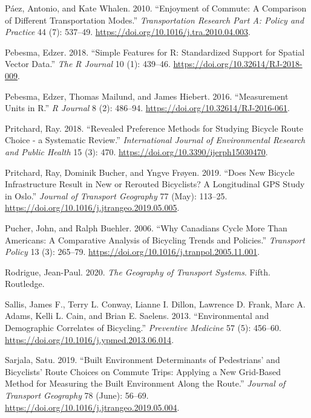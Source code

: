 \documentclass[smallextended]{svjour3}       %
\begin{document}
\leavevmode\hypertarget{ref-paezEnjoymentCommuteComparison2010}{}%
Páez, Antonio, and Kate Whalen. 2010. ``Enjoyment of Commute: A
Comparison of Different Transportation Modes.'' \emph{Transportation
Research Part A: Policy and Practice} 44 (7): 537--49.
\url{https://doi.org/10.1016/j.tra.2010.04.003}.

\leavevmode\hypertarget{ref-Pebesma2018}{}%
Pebesma, Edzer. 2018. ``Simple Features for R: Standardized Support for
Spatial Vector Data.'' \emph{The R Journal} 10 (1): 439--46.
\url{https://doi.org/10.32614/RJ-2018-009}.

\leavevmode\hypertarget{ref-Pebesma2016}{}%
Pebesma, Edzer, Thomas Mailund, and James Hiebert. 2016. ``Measurement
Units in R.'' \emph{R Journal} 8 (2): 486--94.
\url{https://doi.org/10.32614/RJ-2016-061}.

\leavevmode\hypertarget{ref-Pritchard2018}{}%
Pritchard, Ray. 2018. ``Revealed Preference Methods for Studying Bicycle
Route Choice - a Systematic Review.'' \emph{International Journal of
Environmental Research and Public Health} 15 (3): 470.
\url{https://doi.org/10.3390/ijerph15030470}.

\leavevmode\hypertarget{ref-Pritchard2019}{}%
Pritchard, Ray, Dominik Bucher, and Yngve Frøyen. 2019. ``Does New
Bicycle Infrastructure Result in New or Rerouted Bicyclists? A
Longitudinal GPS Study in Oslo.'' \emph{Journal of Transport Geography}
77 (May): 113--25. \url{https://doi.org/10.1016/j.jtrangeo.2019.05.005}.

\leavevmode\hypertarget{ref-Pucher2006}{}%
Pucher, John, and Ralph Buehler. 2006. ``Why Canadians Cycle More Than
Americans: A Comparative Analysis of Bicycling Trends and Policies.''
\emph{Transport Policy} 13 (3): 265--79.
\url{https://doi.org/10.1016/j.tranpol.2005.11.001}.

\leavevmode\hypertarget{ref-Rodrigue2020}{}%
Rodrigue, Jean-Paul. 2020. \emph{The Geography of Transport Systems}.
Fifth. Routledge.

\leavevmode\hypertarget{ref-Sallis2013}{}%
Sallis, James F., Terry L. Conway, Lianne I. Dillon, Lawrence D. Frank,
Marc A. Adams, Kelli L. Cain, and Brian E. Saelens. 2013.
``Environmental and Demographic Correlates of Bicycling.''
\emph{Preventive Medicine} 57 (5): 456--60.
\url{https://doi.org/10.1016/j.ypmed.2013.06.014}.

\leavevmode\hypertarget{ref-Sarjala2019}{}%
Sarjala, Satu. 2019. ``Built Environment Determinants of Pedestrians'
and Bicyclists' Route Choices on Commute Trips: Applying a New
Grid-Based Method for Measuring the Built Environment Along the Route.''
\emph{Journal of Transport Geography} 78 (June): 56--69.
\url{https://doi.org/10.1016/j.jtrangeo.2019.05.004}.
\end{document}
